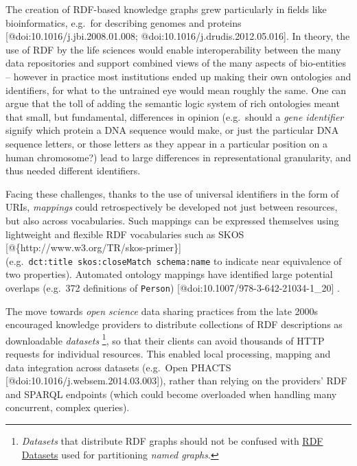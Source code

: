 The creation of RDF-based knowledge graphs grew particularly in fields
like bioinformatics, e.g.~for describing genomes and proteins
{[}@doi:10.1016/j.jbi.2008.01.008; @doi:10.1016/j.drudis.2012.05.016{]}.
In theory, the use of RDF by the life sciences would enable
interoperability between the many data repositories and support combined
views of the many aspects of bio-entities -- however in practice most
institutions ended up making their own ontologies and identifiers, for
what to the untrained eye would mean roughly the same. One can argue
that the toll of adding the semantic logic system of rich ontologies
meant that small, but fundamental, differences in opinion (e.g.~should a
\emph{gene identifier} signify which protein a DNA sequence would make,
or just the particular DNA sequence letters, or those letters as they
appear in a particular position on a human chromosome?) lead to large
differences in representational granularity, and thus needed different
identifiers.

Facing these challenges, thanks to the use of universal identifiers in
the form of URIs, \emph{mappings} could retrospectively be developed not
just between resources, but also across vocabularies. Such mappings can
be expressed themselves using lightweight and flexible RDF vocabularies
such as SKOS {[}@\{http://www.w3.org/TR/skos-primer\}{]}
(e.g.~\texttt{dct:title\ skos:closeMatch\ schema:name} to indicate near
equivalence of two properties). Automated ontology mappings have
identified large potential overlaps (e.g.~372 definitions of
\texttt{Person}) {[}@doi:10.1007/978-3-642-21034-1\_20{]} .

The move towards \emph{open science} data sharing practices from the
late 2000s encouraged knowledge providers to distribute collections of
RDF descriptions as downloadable \emph{datasets} \footnote{\emph{Datasets}
  that distribute RDF graphs should not be confused with
  \href{https://www.w3.org/TR/rdf11-concepts/\#section-dataset}{RDF
  Datasets} used for partitioning \emph{named graphs}.}, so that their
clients can avoid thousands of HTTP requests for individual resources.
This enabled local processing, mapping and data integration across
datasets (e.g.~Open PHACTS {[}@doi:10.1016/j.websem.2014.03.003{]}),
rather than relying on the providers' RDF and SPARQL endpoints (which
could become overloaded when handling many concurrent, complex queries).

